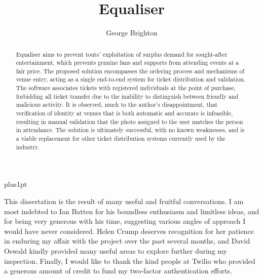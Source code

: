 \documentclass[12pt,a4paper]{bhamdissertation}
\title{Equaliser}
\author{George Brighton}
\begin{document}
\baselineskip=18pt plus1pt

\setcounter{secnumdepth}{3}
\setcounter{tocdepth}{1}

\maketitle

\begin{romanpages}

\tableofcontents

\cleardoublepage{}
\begin{abstract}
Equaliser aims to prevent touts' exploitation of surplus demand for sought-after entertainment, which prevents genuine fans and supports from attending events at a fair price. The proposed solution encompasses the ordering process and mechanisms of venue entry, acting as a single end-to-end system for ticket distribution and validation. The software associates tickets with registered individuals at the point of purchase, forbidding all ticket transfer due to the inability to distinguish between friendly and malicious activity. It is observed, much to the author's disappointment, that verification of identity at venues that is both automatic and accurate is infeasible, resulting in manual validation that the photo assigned to the user matches the person in attendance. The solution is ultimately successful, with no known weaknesses, and is a viable replacement for other ticket distribution systems currently used by the industry.
\end{abstract}

\cleardoublepage{}
\begin{acknowledgements}
This dissertation is the result of many useful and fruitful conversations. I am most indebted to Ian Batten for his boundless enthusiasm and limitless ideas, and for being very generous with his time, suggesting various angles of approach I would have never considered. Helen Crump deserves recognition for her patience in enduring my affair with the project over the past several months, and David Oswald kindly provided many useful areas to explore further during my inspection. Finally, I would like to thank the kind people at Twilio who provided a generous amount of credit to fund my two-factor authentication efforts.
\end{acknowledgements}

\end{romanpages}
\end{document}
